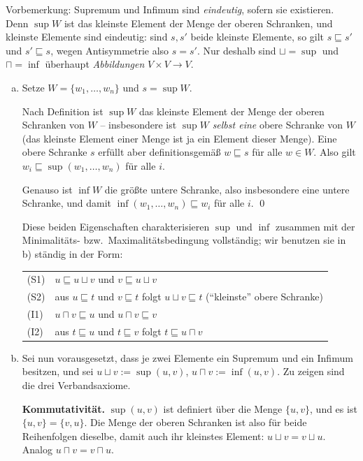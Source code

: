 \begin{loesung}
Vorbemerkung: Supremum und Infimum sind \emph{eindeutig}, sofern sie existieren. Denn $\sup W$ ist das kleinste Element der Menge der oberen Schranken, und kleinste Elemente sind eindeutig: sind $s,s'$ beide kleinste Elemente, so gilt $s\sqsubseteq s'$ und $s'\sqsubseteq s$, wegen Antisymmetrie also $s=s'$. Nur deshalb sind $\sqcup=\sup$ und $\sqcap=\inf$ überhaupt \emph{Abbildungen} $V\times V\to V$.

\begin{enumerate}[a)]
  \item Setze $W=\{w_1,\dots,w_n\}$ und $s=\sup W$.

  Nach Definition ist $\sup W$ das kleinste Element der Menge der oberen Schranken von $W$ -- insbesondere ist $\sup W$ \emph{selbst eine} obere Schranke von $W$ (das kleinste Element einer Menge ist ja ein Element dieser Menge). Eine obere Schranke $s$ erfüllt aber definitionsgemäß $w\sqsubseteq s$ für alle $w\in W$. Also gilt $w_i\sqsubseteq\sup(w_1,\dots,w_n)$ für alle $i$.

  Genauso ist $\inf W$ die größte untere Schranke, also insbesondere eine untere Schranke, und damit $\inf(w_1,\dots,w_n)\sqsubseteq w_i$ für alle $i$. \qed

  Diese beiden Eigenschaften charakterisieren $\sup$ und $\inf$ zusammen mit der Minimalitäts- bzw.\ Maximalitätsbedingung vollständig; wir benutzen sie in b) ständig in der Form:
  \begin{center}\small
  \begin{tabular}{ll}
  (S1) & $u\sqsubseteq u\sqcup v$ und $v\sqsubseteq u\sqcup v$\\
  (S2) & aus $u\sqsubseteq t$ und $v\sqsubseteq t$ folgt $u\sqcup v\sqsubseteq t$ \quad(\enquote{kleinste} obere Schranke)\\
  (I1) & $u\sqcap v\sqsubseteq u$ und $u\sqcap v\sqsubseteq v$\\
  (I2) & aus $t\sqsubseteq u$ und $t\sqsubseteq v$ folgt $t\sqsubseteq u\sqcap v$
  \end{tabular}
  \end{center}

  \item Sei nun vorausgesetzt, dass je zwei Elemente ein Supremum und ein Infimum besitzen, und sei $u\sqcup v:=\sup(u,v)$, $u\sqcap v:=\inf(u,v)$. Zu zeigen sind die drei Verbandsaxiome.

  \textbf{Kommutativität.} $\sup(u,v)$ ist definiert über die Menge $\{u,v\}$, und es ist $\{u,v\}=\{v,u\}$. Die Menge der oberen Schranken ist also für beide Reihenfolgen dieselbe, damit auch ihr kleinstes Element: $u\sqcup v=v\sqcup u$. Analog $u\sqcap v=v\sqcap u$.


\end{enumerate}
\end{loesung}
